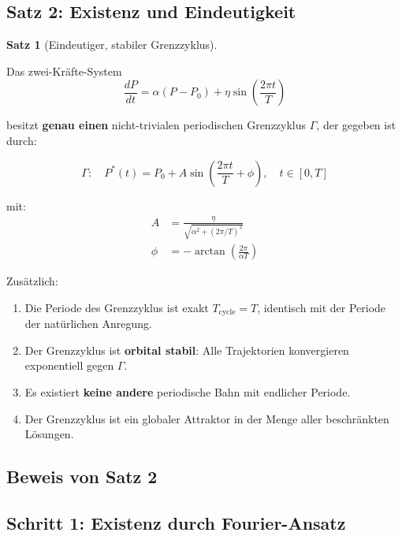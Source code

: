 \documentclass[a4paper, 12pt, twoside, openright]{report}
\theoremstyle{definition}
\theoremstyle{definition}
\newtheorem{satz}{Satz}[chapter]
\begin{document}
\subsection{Satz 2: Existenz und Eindeutigkeit}

\begin{satz}[Eindeutiger, stabiler Grenzzyklus]\label{satz:grenzzyklus}
    
    Das zwei-Kräfte-System
    \begin{equation}
        \frac{dP}{dt} = \alpha(P - P_0) + \eta \sin\left(\frac{2\pi t}{T}\right)
    \end{equation}
    
    besitzt \textbf{genau einen} nicht-trivialen periodischen Grenzzyklus $\Gamma$, der gegeben ist durch:
    
    \begin{equation}
        \boxed{\Gamma: \quad P^*(t) = P_0 + A \sin\left(\frac{2\pi t}{T} + \phi\right), \quad t \in [0, T]}
    \end{equation}
    
    mit:
    \begin{align}
        A &= \frac{\eta}{\sqrt{\alpha^2 + (2\pi/T)^2}} \label{eq:amplitude}\\
        \phi &= -\arctan\left(\frac{2\pi}{\alpha T}\right) \label{eq:phase}
    \end{align}
    
    Zusätzlich:
    \begin{enumerate}
        \item Die Periode des Grenzzyklus ist exakt $T_{\text{cycle}} = T$, identisch mit der Periode der natürlichen Anregung.
        \item Der Grenzzyklus ist \textbf{orbital stabil}: Alle Trajektorien konvergieren exponentiell gegen $\Gamma$.
        \item Es existiert \textbf{keine andere} periodische Bahn mit endlicher Periode.
        \item Der Grenzzyklus ist ein globaler Attraktor in der Menge aller beschränkten Lösungen.
    \end{enumerate}
\end{satz}

\subsection{Beweis von Satz 2}

\subsection{Schritt 1: Existenz durch Fourier-Ansatz}
\end{document}
